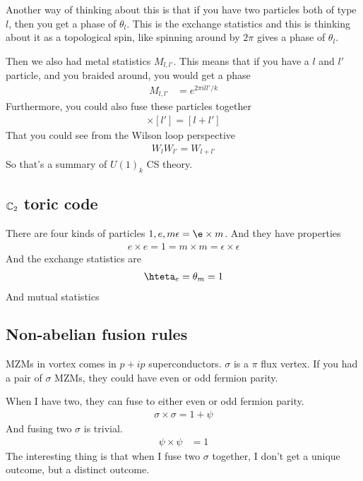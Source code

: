 Another way of thinking about this is that if you have two particles both of
type $l$,
then you get a phase of $\theta_l$.
This is the exchange statistics and this is thinking about it as a topological
spin,
like spinning around by $2\pi$ gives a phase of $\theta_l$.

Then we also had metal statistics $M_{l,l'}$.
This means that if you have a $l$ and $l'$ particle,
and you braided around,
you would get a phase
\begin{align}
    M_{l,l'}
    &=
    e^{2\pi i l l'/k}
\end{align}
Furthermore,
you could also fuse these particles together
\begin{align}
    [l] \times [l'] = [l + l']
\end{align}
That you could see from the Wilson loop perspective
\begin{align}
    W_{l} W_{l'} = W_{l + l'}
\end{align}
So that's a summary of $U(1)_k$ CS theory.


\subsection{$\mathbb{C}_2$ toric code}
There are four kinds of particles
$1,e,m\epsilon=\e\times m$.
And they have properties
\begin{align}
    e\times e = 1 = m\times m = \epsilon\times \epsilon
\end{align}
And the exchange statistics are
\begin{align}
    \hteta_e = \theta_m = 1
\end{align}
And mutual statistics

\subsection{Non-abelian fusion rules}
MZMs in vortex comes in $p + ip$ superconductors.
$\sigma$ is a $\pi$ flux vertex.
If you had a pair of $\sigma$ MZMs,
they could have even or odd fermion parity.

When I have two,
they can fuse to either even or odd fermion parity.
\begin{align}
    \sigma\times \sigma = 1 + \psi
\end{align}
And fusing two $\sigma$ is trivial.
\begin{align}
    \psi\times\psi &= 1
\end{align}
The interesting thing is that when I fuse two $\sigma$ together,
I don't get a unique outcome,
but a distinct outcome.

